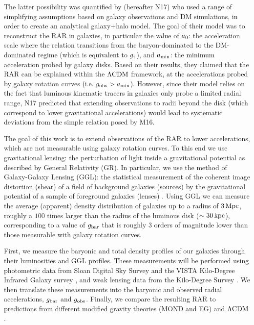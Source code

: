 \documentclass[fleqn,usenatbib]{mnras}
\newcommand{\lcdm}{{\rm \Lambda CDM}}
\newcommand{\un}[1]{_{\rm #1}}
\begin{document}
The latter possibility was quantified by \cite{navarro2017} (hereafter N17) who used a range of simplifying assumptions based on galaxy observations and DM simulations, in order to create an analytical galaxy+halo model. The goal of their model was to reconstruct the RAR in galaxies, in particular the value of $a\un{0}$: the acceleration scale where the relation transitions from the baryon-dominated to the DM-dominated regime (which is equivalent to $g\un{\dagger}$), and $a\un{min}$: the minimum acceleration probed by galaxy disks. Based on their results, they claimed that the RAR can be explained within the $\lcdm$ framework, at the accelerations probed by galaxy rotation curves (i.e. $g\un{obs}>a\un{min}$). However, since their model relies on the fact that luminous kinematic tracers in galaxies only probe a limited radial range, N17 predicted that extending observations to radii beyond the disk (which correspond to lower gravitational accelerations) would lead to systematic deviations from the simple relation posed by M16.

The goal of this work is to extend observations of the RAR to lower accelerations, which are not measurable using galaxy rotation curves. To this end we use gravitational lensing: the perturbation of light inside a gravitational potential as described by General Relativity (GR). In particular, we use the method of Galaxy-Galaxy Lensing (GGL): the statistical measurement of the coherent image distortion (shear) of a field of background galaxies (sources) by the gravitational potential of a sample of foreground galaxies (lenses) \cite[for examples, see e.g.][]{fischer2000ggl,hoekstra2004,mandelbaum2006,uitert2016}. Using GGL we can measure the average (apparent) density distribution of galaxies up to a radius of $3\,{\rm Mpc}$, roughly a $100$ times larger than the radius of the luminous disk ($\sim 30\,{\rm kpc}$), corresponding to a value of $g\un{bar}$ that is roughly $3$ orders of magnitude lower than those measurable with galaxy rotation curves.

First, we measure the baryonic and total density profiles of our galaxies through their luminosities and GGL profiles. These measurements will be performed using photometric data from Sloan Digital Sky Survey \cite[SDSS,]{abazajian2009} and the VISTA Kilo-Degree Infrared Galaxy survey \cite[VIKING]{edge2013}, and weak lensing data from the Kilo-Degree Survey \cite[KiDS,][]{dejong2017}. We then translate these measurements into the baryonic and observed radial accelerations, $g\un{bar}$ and $g\un{obs}$. Finally, we compare the resulting RAR to predictions from different modified gravity theories (MOND and EG) and $\lcdm$.
\end{document}
